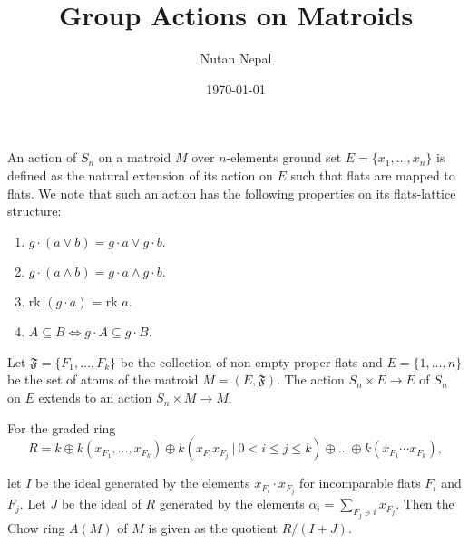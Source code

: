 \documentclass[12pt]{article}
\title{Group Actions on Matroids}
\author{Nutan Nepal}
\date{\today}
\begin{document}
\maketitle

\hspace*{5mm} An action of $S_n$ on a matroid $M$ over $n$-elements ground set $E=\{x_1,\ldots,x_n\}$ is defined as the natural extension of its action on $E$
such that flats are mapped to flats. We note that such an action has the following properties
on its flats-lattice structure:

\begin{enumerate}
    \item $g\cdot(a \vee b) = g\cdot a\vee g\cdot b.$
    \item $g\cdot(a \wedge b) = g\cdot a\wedge g\cdot b.$
    \item rk $(g\cdot a)$ = rk $a$.
    \item $A\subseteq B \iff g\cdot A\subseteq g\cdot B$.
\end{enumerate}

Let $\mathfrak{F}=\{F_1,\ldots,F_k\}$ be the collection of non empty proper flats and $E=\{1,\ldots,n\}$ be the set of
atoms of the matroid $M=(E,\mathfrak{F})$. The action $S_n \times E\to E$ of $S_n$ on $E$ extends to an action $S_n \times M
    \to M$.


For the graded ring $$R = k \oplus k(x_{F_1},\ldots,x_{F_k})
    \oplus k(x_{F_i}x_{F_j}\ |\ 0<i\leq j\leq k) \oplus \ldots \oplus k(x_{F_1}\cdots x_{F_k}),$$

let $I$ be the ideal generated by the elements $x_{F_i}\cdot x_{F_j}$ for incomparable flats $F_i$ and $F_j$.
Let $J$ be the ideal of $R$ generated by the elements $\alpha_{i}=\sum_{F_j\ni i}x_{F_j}$.
Then the Chow ring $A(M)$ of $M$ is given as the quotient $R/(I+J)$.

\setcounter{section}{1}
\setcounter{theorem}{1}
\end{document}
